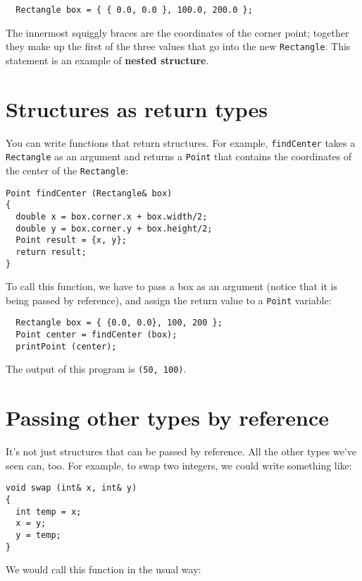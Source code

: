 \begin{verbatim}
  Rectangle box = { { 0.0, 0.0 }, 100.0, 200.0 };
\end{verbatim}
%
The innermost squiggly braces are the coordinates of the
corner point; together they make up the first of the three
values that go into the new {\tt Rectangle}.  This statement
is an example of {\bf nested structure}.



\section{Structures as return types}

You can write functions that return structures.  For example,
{\tt findCenter} takes a {\tt Rectangle} as an argument and
returns a {\tt Point} that contains the coordinates of the
center of the {\tt Rectangle}:

\begin{verbatim}
Point findCenter (Rectangle& box)
{
  double x = box.corner.x + box.width/2;
  double y = box.corner.y + box.height/2;
  Point result = {x, y};
  return result;
}
\end{verbatim}
%
To call this function, we have to pass a box as an argument
(notice that it is being passed by reference), and assign the
return value to a {\tt Point} variable:

\begin{verbatim}
  Rectangle box = { {0.0, 0.0}, 100, 200 };
  Point center = findCenter (box);
  printPoint (center);
\end{verbatim}
%
The output of this program is {\tt (50, 100)}.

\section {Passing other types by reference}

It's not just structures that can be passed by reference.
All the other types we've seen can, too.  For example, to swap
two integers, we could write something like:

\begin{verbatim}
void swap (int& x, int& y)
{
  int temp = x;
  x = y;
  y = temp;
}
\end{verbatim}
%
We would call this function in the usual way:

